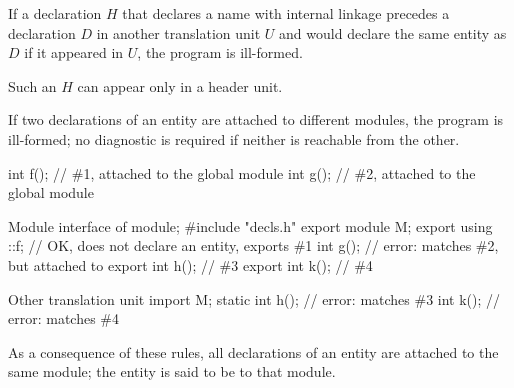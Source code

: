 \pnum
If a declaration $H$ that declares a name with internal linkage
precedes a declaration $D$ in another translation unit $U$ and
would declare the same entity as $D$ if it appeared in $U$,
the program is ill-formed.
\begin{note}
Such an $H$ can appear only in a header unit.
\end{note}

\pnum
If two declarations of an entity are
attached to different modules, the program is ill-formed;
no diagnostic is required if neither is reachable from the other.
\begin{example}
\begin{codeblocktu}{}
int f();            // \#1, attached to the global module
int g();            // \#2, attached to the global module
\end{codeblocktu}

\begin{codeblocktu}{Module interface of }
module;
#include "decls.h"
export module M;
export using ::f;   // OK, does not declare an entity, exports \#1
int g();            // error: matches \#2, but attached to 
export int h();     // \#3
export int k();     // \#4
\end{codeblocktu}

\begin{codeblocktu}{Other translation unit}
import M;
static int h();     // error: matches \#3
int k();            // error: matches \#4
\end{codeblocktu}
\end{example}
As a consequence of these rules,
all declarations of an entity are attached to the same module;
the entity is said to be  to that module.

